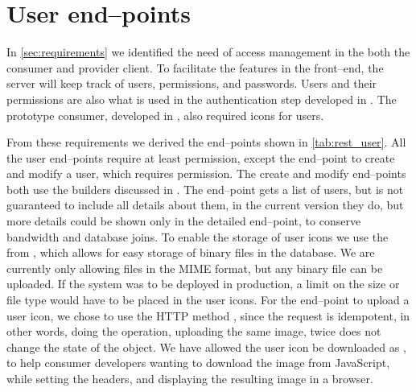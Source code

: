 \section{User end--points}

In \cref{sec:requirements} we identified the need of access management in the
both the consumer and provider client. To facilitate the features in the
front--end, the server will keep track of users, permissions, and passwords.
Users and their permissions are also what is used in the authentication step
developed in . The prototype consumer, developed in
, also required icons for users.


From these requirements we derived the end--points shown in \cref{tab:rest_user}.
All the user end--points require at least  permission, except the
end--point to create and modify a user, which requires 
permission. The create and modify end--points both use the builders discussed in
. The  end--point gets a list of users,
but is not guaranteed to include all details about them, in the current version
they do, but more details could be shown only in the detailed 
end--point, to conserve bandwidth and database joins. To enable the storage of
user icons we use the  from ,
which allows for easy storage of binary files in the database. We are currently
only allowing files in the  \ac{MIME} format, but any binary
file can be uploaded.  If the system was to be deployed in production, a limit
on the size or file type would have to be placed in the user icons. For the
end--point to upload a user icon, we chose to use the HTTP method ,
since the request is idempotent, in other words, doing the operation, uploading
the same image, twice does not change the state of the object. We have allowed
the user icon be downloaded as , to help consumer developers
wanting to download the image from JavaScript, while setting the headers, and
displaying the resulting image in a browser.

